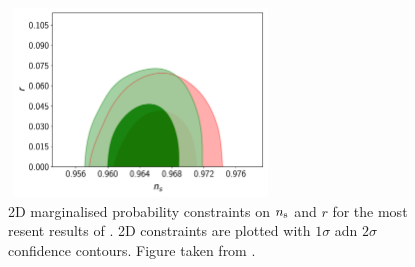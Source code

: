 \documentclass{rmaa}
\begin{document}
\begin{figure}[h!]
 \begin{center}
  \includegraphics[trim = 1mm 1mm 1mm 1mm, clip, width=7cm, height=5cm]{inflation_rns}
\caption{2D marginalised probability constraints on $n_{\rm s}$ and $r$ for
the most resent results of \citep{PlanckC}. 2D constraints are plotted with $1\sigma$ adn $2\sigma$
confidence contours. Figure taken from \citet{PlanckC}.
}\label{fig:infla_2}
\end{center}
\end{figure}	
\end{document}
